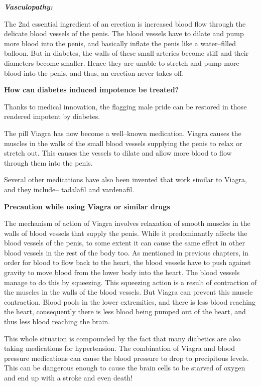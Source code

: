  \item 
 \textbf{\textit{Vasculopathy:}}

 The 2nd essential ingredient of an erection is increased blood flow through the delicate blood vessels of the penis. The blood vessels have to dilate and pump more blood into the penis, and basically inflate the penis like a water–filled balloon. But in diabetes, the walls of these small arteries become stiff and their diameters become smaller. Hence they are unable to stretch and pump more blood into the penis, and thus, an erection never takes off.



\textbf{How can diabetes induced impotence be treated?}

Thanks to medical innovation, the flagging male pride can be restored in those rendered impotent by diabetes.

The pill Viagra has now become a well–known medication. Viagra causes the muscles in the walls of the small blood vessels supplying the penis to relax or stretch out. This causes the vessels to dilate and allow more blood to flow through them into the penis.

Several other medications have also been invented that work similar to Viagra, and they include– tadalafil and vardenafil.

\textbf{Precaution while using Viagra or similar drugs}

The mechanism of action of Viagra involves relaxation of smooth muscles in the walls of blood vessels that supply the penis. While it predominantly affects the blood vessels of the penis, to some extent it can cause the same effect in other blood vessels in the rest of the body too. As mentioned in previous chapters, in order for blood to flow back to the heart, the blood vessels have to push against gravity to move blood from the lower body into the heart. The blood vessels manage to do this by squeezing. This squeezing action is a result of contraction of the muscles in the walls of the blood vessels. But Viagra can prevent this muscle contraction. Blood pools in the lower extremities, and there is less blood reaching the heart, consequently there is less blood being pumped out of the heart, and thus less blood reaching the brain.

This whole situation is compounded by the fact that many diabetics are also taking medications for hypertension. The combination of Viagra and blood pressure medications can cause the blood pressure to drop to precipitous levels. This can be dangerous enough to cause the brain cells to be starved of oxygen and end up with a stroke and even death!

